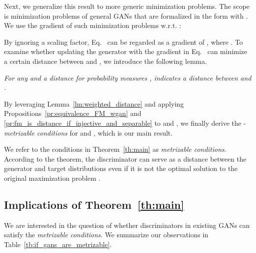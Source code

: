 Next, we generalize this result to more generic minimization problems. The scope is minimization problems of general GANs that are formalized in the form  with .
We use the gradient of such minimization problems w.r.t. :

By ignoring a scaling factor, Eq.~ can be regarded as a gradient of \yuhtb{}, where . To examine whether updating the generator with the gradient in Eq.~ can minimize a certain distance between  and , we introduce the following lemma.
\begin{lemma}
\textit{
For any \yuhtb{} and a distance for probability measures ,  indicates a distance between  and .
} \label{lm:weighted_distance}
\end{lemma}
By leveraging Lemma~\ref{lm:weighted_distance} and applying Propositions~\ref{pr:equivalence_FM_wgan} and \ref{pr:fm_is_distance_if_injective_and_separable} to  and , we finally derive the -\textit{metrizable conditions} for  and , which is our main result.

We refer to the conditions in Theorem~\ref{th:main} as \textit{metrizable conditions}.
According to the theorem, the discriminator  can serve as a distance between the generator and target distributions even if it is not the optimal solution to the original maximization problem . 

\subsection{Implications of Theorem~\ref{th:main}}
We are interested in the question of whether discriminators in existing GANs can satisfy the \textit{metrizable conditions}.
We summarize our observations in Table~\ref{tb:if_gans_are_metrizable}.

